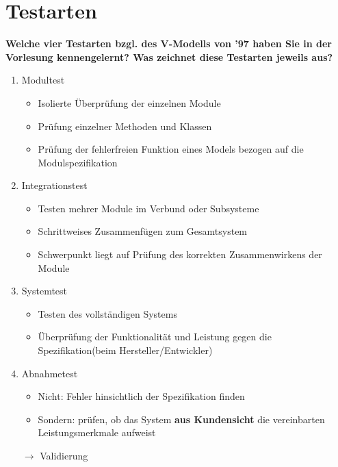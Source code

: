 \section{Testarten}
\textbf{Welche vier Testarten bzgl. des V-Modells von '97 haben Sie in der Vorlesung kennengelernt? Was zeichnet diese Testarten jeweils aus?}
\begin{enumerate}
    \item Modultest\begin{itemize}
              \item Isolierte Überprüfung der einzelnen Module
              \item Prüfung einzelner Methoden und Klassen
              \item Prüfung der fehlerfreien Funktion eines Models bezogen auf die Modulspezifikation
          \end{itemize}
    \item Integrationstest\begin{itemize}
              \item Testen mehrer Module im Verbund oder Subsysteme
              \item Schrittweises Zusammenfügen zum Gesamtsystem
              \item Schwerpunkt liegt auf Prüfung des korrekten Zusammenwirkens der Module
          \end{itemize}
    \item Systemtest\begin{itemize}
              \item Testen des vollständigen Systems
              \item Überprüfung der Funktionalität und Leistung gegen die Spezifikation(beim Hersteller/Entwickler)
          \end{itemize}
    \item Abnahmetest\begin{itemize}
        \item Nicht: Fehler hinsichtlich der Spezifikation finden
        \item Sondern: prüfen, ob das System \textbf{aus Kundensicht} die vereinbarten Leistungsmerkmale aufweist
    \end{itemize}
    $\rightarrow$ Validierung
\end{enumerate}
